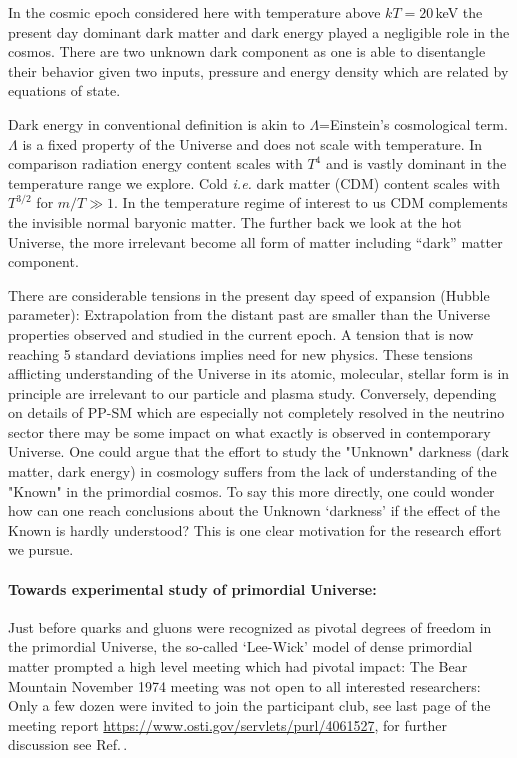 In the cosmic epoch considered here with temperature above $kT=20$\,keV the present day dominant dark matter and dark energy played a negligible role in the cosmos. There are two unknown dark component as one is able to disentangle their behavior given two inputs, pressure and energy density which are related by equations of state.  

Dark energy in conventional definition is akin to $\Lambda$=Einstein's cosmological term. $\Lambda$ is a fixed property of the Universe and does not scale with temperature. In comparison radiation energy content scales with $T^4$ and is vastly dominant in the temperature range we explore. Cold {\it i.e.\/} dark matter (CDM) content scales with $T^{3/2}$ for $m/T\gg 1$. In the temperature regime of interest to us CDM complements the invisible normal baryonic matter. The further back we look at the hot Universe, the more irrelevant become all form of matter including  ``dark'' matter component. 

There are considerable tensions in the present day speed of expansion (Hubble parameter): Extrapolation from the distant past are smaller than the Universe properties observed and studied in the current epoch. A tension that is now reaching 5 standard deviations implies need for new physics. These tensions afflicting understanding of the Universe in its atomic, molecular, stellar form is in principle are irrelevant to our particle and plasma study.  Conversely, depending on details of PP-SM which are especially not completely resolved in the neutrino sector there may be some impact on what exactly is observed in contemporary Universe. One could argue that the effort to study the "Unknown" darkness (dark matter, dark energy) in cosmology suffers from the lack of understanding of the "Known" in the primordial cosmos. To say this more directly, one could wonder how can one reach conclusions about the Unknown `darkness' if the effect of the Known is hardly understood? This is one clear motivation for the research effort we pursue. 
 
\paragraph{Towards experimental study of primordial Universe:} Just before quarks and gluons were recognized as pivotal degrees of freedom in the primordial Universe, the so-called `Lee-Wick' model of dense  primordial matter prompted a high level meeting which had pivotal impact: The Bear Mountain November 1974 meeting was not open to all interested researchers: Only a few dozen  were invited to join the participant club, see last page of the meeting report \url{https://www.osti.gov/servlets/purl/4061527}, for further discussion see Ref.\,\cite{Rafelski:2019twp}.  

